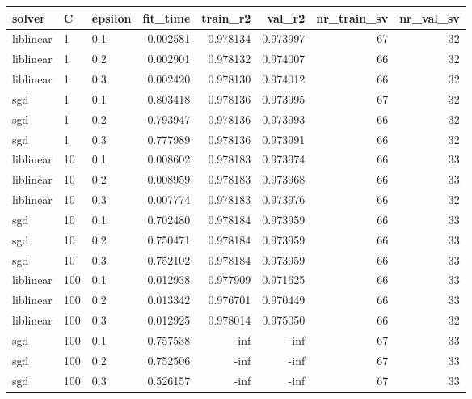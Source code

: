 \begin{tabular}{lllrrrrr}
\toprule
   solver &   C & epsilon &  fit\_time &  train\_r2 &   val\_r2 &  nr\_train\_sv &  nr\_val\_sv \\
\midrule
liblinear &   1 &     0.1 &  0.002581 &  0.978134 & 0.973997 &           67 &         32 \\
liblinear &   1 &     0.2 &  0.002901 &  0.978132 & 0.974007 &           66 &         32 \\
liblinear &   1 &     0.3 &  0.002420 &  0.978130 & 0.974012 &           66 &         32 \\
      sgd &   1 &     0.1 &  0.803418 &  0.978136 & 0.973995 &           67 &         32 \\
      sgd &   1 &     0.2 &  0.793947 &  0.978136 & 0.973993 &           66 &         32 \\
      sgd &   1 &     0.3 &  0.777989 &  0.978136 & 0.973991 &           66 &         32 \\
liblinear &  10 &     0.1 &  0.008602 &  0.978183 & 0.973974 &           66 &         33 \\
liblinear &  10 &     0.2 &  0.008959 &  0.978183 & 0.973968 &           66 &         33 \\
liblinear &  10 &     0.3 &  0.007774 &  0.978183 & 0.973976 &           66 &         32 \\
      sgd &  10 &     0.1 &  0.702480 &  0.978184 & 0.973959 &           66 &         33 \\
      sgd &  10 &     0.2 &  0.750471 &  0.978184 & 0.973959 &           66 &         33 \\
      sgd &  10 &     0.3 &  0.752102 &  0.978184 & 0.973959 &           66 &         33 \\
liblinear & 100 &     0.1 &  0.012938 &  0.977909 & 0.971625 &           66 &         33 \\
liblinear & 100 &     0.2 &  0.013342 &  0.976701 & 0.970449 &           66 &         33 \\
liblinear & 100 &     0.3 &  0.012925 &  0.978014 & 0.975050 &           66 &         32 \\
      sgd & 100 &     0.1 &  0.757538 &      -inf &     -inf &           67 &         33 \\
      sgd & 100 &     0.2 &  0.752506 &      -inf &     -inf &           67 &         33 \\
      sgd & 100 &     0.3 &  0.526157 &      -inf &     -inf &           67 &         33 \\
\bottomrule
\end{tabular}
